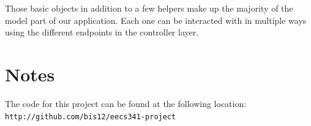 \documentclass{acm_proc_article-sp}
\begin{document}
Those basic objects in addition to a few helpers make up the majority of the model part of our application.  Each one can be interacted with in multiple ways using the different endpoints in the controller layer.


\section*{Notes}
The code for this project can be found at the following location:\\
\texttt{http://github.com/bis12/eecs341-project}
\end{document}
